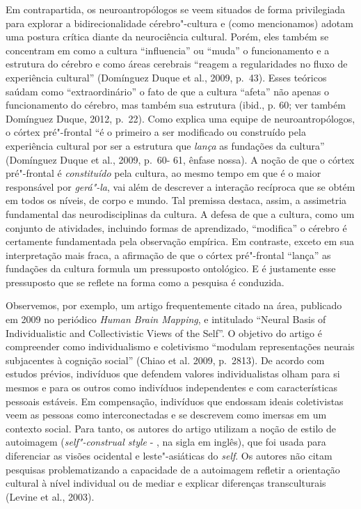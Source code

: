 Em contrapartida, os neuroantropólogos se veem situados de forma
privilegiada para explorar a bidirecionalidade cérebro"-cultura e (como
mencionamos) adotam uma postura crítica diante da neurociência cultural.
Porém, eles também se concentram em como a cultura ``influencia'' ou
``muda'' o funcionamento e a estrutura do cérebro e como áreas cerebrais
``reagem a regularidades no fluxo de experiência cultural'' (Domínguez
Duque et al., 2009, p.~43). Esses teóricos saúdam como ``extraordinário''
o fato de que a cultura ``afeta'' não apenas o funcionamento do cérebro,
mas também sua estrutura (ibid., p. 60; ver também Domínguez Duque,
2012, p.~22). Como explica uma equipe de neuroantropólogos, o córtex
pré"-frontal ``é o primeiro a ser modificado ou construído pela
experiência cultural por ser a estrutura que \emph{lança} as fundações
da cultura'' (Domínguez Duque et al., 2009, p.~60- 61, ênfase nossa). A
noção de que o córtex pré"-frontal é \emph{constituído} pela cultura, ao
mesmo tempo em que é o maior responsável por \emph{gerá"-la}, vai além de
descrever a interação recíproca que se obtém em todos os níveis, de
corpo e mundo. Tal premissa destaca, assim, a assimetria fundamental das
neurodisciplinas da cultura. A defesa de que a cultura, como um conjunto
de atividades, incluindo formas de aprendizado, ``modifica'' o cérebro é
certamente fundamentada pela observação empírica. Em contraste, exceto
em sua interpretação mais fraca, a afirmação de que o córtex pré"-frontal
``lança'' as fundações da cultura formula um pressuposto ontológico. E é
justamente esse pressuposto que se reflete na forma como a pesquisa é
conduzida.

Observemos, por exemplo, um artigo frequentemente citado na área,
publicado em 2009 no periódico \emph{Human Brain Mapping}, e intitulado
``Neural Basis of Individualistic and Collectivistic Views of the
Self''. O objetivo do artigo é compreender como individualismo e
coletivismo ``modulam representações neurais subjacentes à cognição
social'' (Chiao et al. 2009, p.~2813). De acordo com estudos prévios,
indivíduos que defendem valores individualistas olham para si mesmos e
para os outros como indivíduos independentes e com características
pessoais estáveis. Em compensação, indivíduos que endossam ideais
coletivistas veem as pessoas como interconectadas e se descrevem como
imersas em um contexto social. Para tanto, os autores do artigo utilizam
a noção de estilo de autoimagem (\emph{self"-construal style} - , na
sigla em inglês), que foi usada para diferenciar as visões ocidental e
leste"-asiáticas do \emph{self}. Os autores não citam pesquisas
problematizando a capacidade de a autoimagem refletir a orientação
cultural à nível individual ou de mediar e explicar diferenças
transculturais (Levine et al., 2003).

